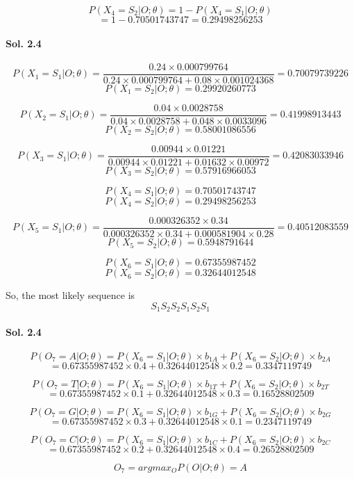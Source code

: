 \documentclass[]{report}
\begin{document}
	\[ P(X_4 = S_2 | O;\theta) = 1 - P(X_4 = S_1 | O;\theta) \]
	\[ = 1 - 0.70501743747 = 0.29498256253 \]


\paragraph{Sol. 2.4}
	\[ P(X_1 = S_1 | O;\theta) = \frac{0.24 \times 0.000799764}{0.24 \times 0.000799764 + 0.08 \times 0.001024368 } = 0.70079739226 \]
	\[ P(X_1 = S_2 | O;\theta) = 0.29920260773  \]

	\[ P(X_2 = S_1 | O;\theta) = \frac{0.04 \times 0.0028758}{0.04 \times 0.0028758 + 0.048 \times 0.0033096 } = 0.41998913443 \]
	\[ P(X_2 = S_2 | O;\theta) = 0.58001086556 \]

	\[ P(X_3 = S_1 | O;\theta) =  \frac{0.00944 \times 0.01221}{0.00944 \times 0.01221 + 0.01632 \times 0.00972 } = 0.42083033946 \]
	\[ P(X_3 = S_2 | O;\theta) = 0.57916966053\]

	\[ P(X_4 = S_1 | O;\theta) =  0.70501743747\]
	\[ P(X_4 = S_2 | O;\theta) = 0.29498256253  \]

	\[ P(X_5 = S_1 | O;\theta) =  \frac{0.000326352 \times 0.34}{0.000326352 \times 0.34 + 0.000581904 \times 0.28} = 0.40512083559 \]
	\[ P(X_5 = S_2 | O;\theta) = 0.5948791644 \]

	\[ P(X_6 = S_1 | O;\theta) = 0.67355987452 \]
	\[ P(X_6 = S_2 | O;\theta) = 0.32644012548 \]

	So, the most likely sequence is 
	\[ S_1 S_2 S_2 S_1 S_2 S_1\]

\paragraph{Sol. 2.4}
	\[ P(O_7 = A | O; \theta) = P(X_6 = S_1| O; \theta) \times b_{1A} +  P(X_6 = S_2| O; \theta) \times b_{2A} \] \[ = 0.67355987452 \times 0.4 + 0.32644012548 \times 0.2 = 0.3347119749\]
	
	\[ P(O_7 = T | O; \theta) = P(X_6 = S_1| O; \theta) \times b_{1T} +  P(X_6 = S_2| O; \theta) \times b_{2T} \] \[ = 0.67355987452 \times 0.1 + 0.32644012548 \times 0.3 = 0.16528802509\]
	
	\[ P(O_7 = G | O; \theta) = P(X_6 = S_1| O; \theta) \times b_{1G} +  P(X_6 = S_2| O; \theta) \times b_{2G} \] \[ = 0.67355987452 \times 0.3 + 0.32644012548 \times 0.1 = 0.2347119749\]
	
	\[ P(O_7 = C | O; \theta) = P(X_6 = S_1| O; \theta) \times b_{1C} +  P(X_6 = S_2| O; \theta) \times b_{2C} \] \[ = 0.67355987452 \times 0.2 + 0.32644012548 \times 0.4 = 0.26528802509\]
	
	 \[ O_7 = argmax_O P(O|O; \theta) = A \]
\end{document}
